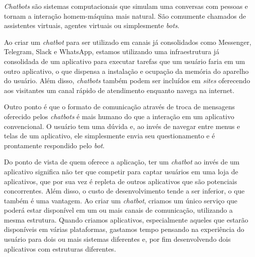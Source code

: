   \textit{Chatbots} são sistemas computacionais que simulam uma conversas com pessoas e tornam a interação homem-máquina mais natural\cite{chatbot_definition}. São comumente chamados de assistentes virtuais, agentes virtuais ou simplesmente \textit{bots}.
  
  Ao criar um \emph{chatbot} para ser utilizado em canais já consolidados como Messenger, Telegram, Slack e WhatsApp, estamos utilizando uma infraestrutura já consolidada de um aplicativo para executar tarefas que um usuário faria em um outro aplicativo, o que dispensa a instalação e ocupação da memória do aparelho do usuário. Além disso, \textit{chatbots} também podem ser incluídos em \textit{sites} oferecendo aos visitantes um canal rápido de atendimento enquanto navega na internet.
  
  Outro ponto é que o formato de comunicação através de troca de mensagens oferecido pelos \emph{chatbots} é mais humano do que a interação em um aplicativo convencional. O usuário tem uma dúvida e, ao invés de navegar entre menus e telas de um aplicativo, ele simplesmente envia seu questionamento e é prontamente respondido pelo \textit{bot}.
  
  Do ponto de vista de quem oferece a aplicação, ter um \emph{chatbot} ao invés de um aplicativo significa não ter que competir para captar usuários em uma loja de aplicativos, que por sua vez é repleta de outros aplicativos que são potenciais concorrentes.  Além disso, o custo de desenvolvimento tende a ser inferior, o que também é uma vantagem. Ao criar um \emph{chatbot}, criamos um único serviço que poderá estar disponível em um ou mais canais de comunicação, utilizando a mesma estrutura. Quando criamos aplicativos, especialmente aqueles que estarão disponíveis em várias plataformas, gastamos tempo pensando na experiência do usuário para dois ou mais sistemas diferentes e, por fim desenvolvendo dois aplicativos com estruturas diferentes.
  
  
  
  
  
  
  
  
